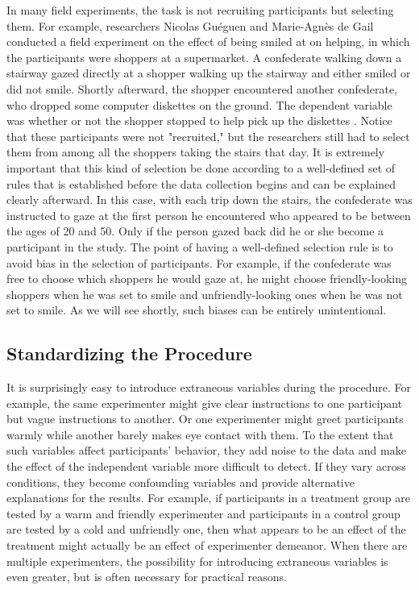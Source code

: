 In many field experiments, the task is not recruiting participants but selecting them. For example, researchers Nicolas Gu\'eguen and Marie-Agnès de Gail conducted a field experiment on the effect of being smiled at on helping, in which the participants were shoppers at a supermarket. A confederate walking down a stairway gazed directly at a shopper walking up the stairway and either smiled or did not smile. Shortly afterward, the shopper encountered another confederate, who dropped some computer diskettes on the ground. The dependent variable was whether or not the shopper stopped to help pick up the diskettes \citep{gueguen_effect_2003}. Notice that these participants were not "recruited," but the researchers still had to select them from among all the shoppers taking the stairs that day. It is extremely important that this kind of selection be done according to a well-defined set of rules that is established before the data collection begins and can be explained clearly afterward. In this case, with each trip down the stairs, the confederate was instructed to gaze at the first person he encountered who appeared to be between the ages of 20 and 50. Only if the person gazed back did he or she become a participant in the study. The point of having a well-defined selection rule is to avoid bias in the selection of participants. For example, if the confederate was free to choose which shoppers he would gaze at, he might choose friendly-looking shoppers when he was set to smile and unfriendly-looking ones when he was not set to smile. As we will see shortly, such biases can be entirely unintentional.

\subsection{Standardizing the Procedure}

It is surprisingly easy to introduce extraneous variables during the procedure. For example, the same experimenter might give clear instructions to one participant but vague instructions to another. Or one experimenter might greet participants warmly while another barely makes eye contact with them. To the extent that such variables affect participants' behavior, they add noise to the data and make the effect of the independent variable more difficult to detect. If they vary across conditions, they become confounding variables and provide alternative explanations for the results. For example, if participants in a treatment group are tested by a warm and friendly experimenter and participants in a control group are tested by a cold and unfriendly one, then what appears to be an effect of the treatment might actually be an effect of experimenter demeanor. When there are multiple experimenters, the possibility for introducing extraneous variables is even greater, but is often necessary for practical reasons.

